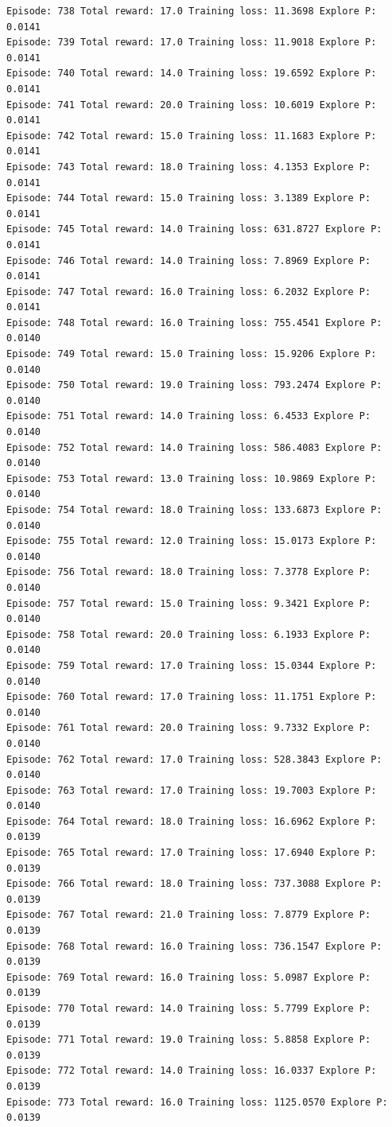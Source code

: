 \documentclass[11pt]{article}
\begin{document}
\begin{Verbatim}[commandchars=\\\{\}]
Episode: 738 Total reward: 17.0 Training loss: 11.3698 Explore P: 0.0141
Episode: 739 Total reward: 17.0 Training loss: 11.9018 Explore P: 0.0141
Episode: 740 Total reward: 14.0 Training loss: 19.6592 Explore P: 0.0141
Episode: 741 Total reward: 20.0 Training loss: 10.6019 Explore P: 0.0141
Episode: 742 Total reward: 15.0 Training loss: 11.1683 Explore P: 0.0141
Episode: 743 Total reward: 18.0 Training loss: 4.1353 Explore P: 0.0141
Episode: 744 Total reward: 15.0 Training loss: 3.1389 Explore P: 0.0141
Episode: 745 Total reward: 14.0 Training loss: 631.8727 Explore P: 0.0141
Episode: 746 Total reward: 14.0 Training loss: 7.8969 Explore P: 0.0141
Episode: 747 Total reward: 16.0 Training loss: 6.2032 Explore P: 0.0141
Episode: 748 Total reward: 16.0 Training loss: 755.4541 Explore P: 0.0140
Episode: 749 Total reward: 15.0 Training loss: 15.9206 Explore P: 0.0140
Episode: 750 Total reward: 19.0 Training loss: 793.2474 Explore P: 0.0140
Episode: 751 Total reward: 14.0 Training loss: 6.4533 Explore P: 0.0140
Episode: 752 Total reward: 14.0 Training loss: 586.4083 Explore P: 0.0140
Episode: 753 Total reward: 13.0 Training loss: 10.9869 Explore P: 0.0140
Episode: 754 Total reward: 18.0 Training loss: 133.6873 Explore P: 0.0140
Episode: 755 Total reward: 12.0 Training loss: 15.0173 Explore P: 0.0140
Episode: 756 Total reward: 18.0 Training loss: 7.3778 Explore P: 0.0140
Episode: 757 Total reward: 15.0 Training loss: 9.3421 Explore P: 0.0140
Episode: 758 Total reward: 20.0 Training loss: 6.1933 Explore P: 0.0140
Episode: 759 Total reward: 17.0 Training loss: 15.0344 Explore P: 0.0140
Episode: 760 Total reward: 17.0 Training loss: 11.1751 Explore P: 0.0140
Episode: 761 Total reward: 20.0 Training loss: 9.7332 Explore P: 0.0140
Episode: 762 Total reward: 17.0 Training loss: 528.3843 Explore P: 0.0140
Episode: 763 Total reward: 17.0 Training loss: 19.7003 Explore P: 0.0140
Episode: 764 Total reward: 18.0 Training loss: 16.6962 Explore P: 0.0139
Episode: 765 Total reward: 17.0 Training loss: 17.6940 Explore P: 0.0139
Episode: 766 Total reward: 18.0 Training loss: 737.3088 Explore P: 0.0139
Episode: 767 Total reward: 21.0 Training loss: 7.8779 Explore P: 0.0139
Episode: 768 Total reward: 16.0 Training loss: 736.1547 Explore P: 0.0139
Episode: 769 Total reward: 16.0 Training loss: 5.0987 Explore P: 0.0139
Episode: 770 Total reward: 14.0 Training loss: 5.7799 Explore P: 0.0139
Episode: 771 Total reward: 19.0 Training loss: 5.8858 Explore P: 0.0139
Episode: 772 Total reward: 14.0 Training loss: 16.0337 Explore P: 0.0139
Episode: 773 Total reward: 16.0 Training loss: 1125.0570 Explore P: 0.0139

\end{Verbatim}
\end{document}

